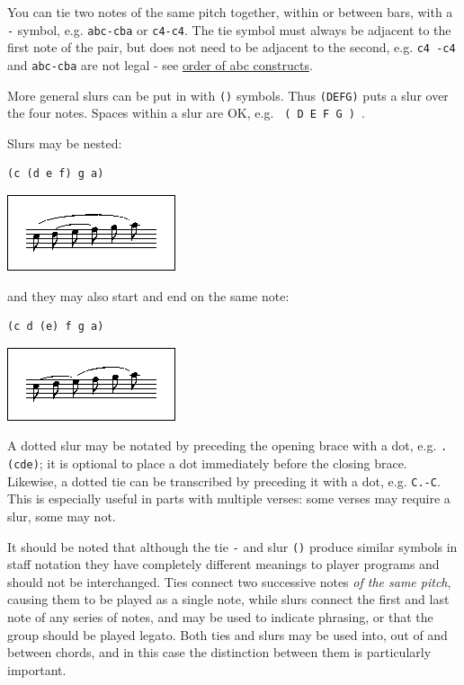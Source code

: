 \documentclass[oneside]{book}
\begin{document}
You can tie two notes of the same pitch together, within or between
bars, with a \texttt{-} symbol, e.g. \texttt{abc-\textbar{}cba} or
\texttt{c4-c4}. The tie symbol must always be adjacent to the first note
of the pair, but does not need to be adjacent to the second, e.g.
\texttt{c4\ -c4} and \texttt{abc\textbar{}-cba} are not legal - see
\protect\hyperlink{order_of_abc_constructs}{order of abc constructs}.

More general slurs can be put in with \texttt{()} symbols. Thus
\texttt{(DEFG)} puts a slur over the four notes. Spaces within a slur
are OK, e.g. \texttt{\ (\ D\ E\ F\ G\ )\ }.

Slurs may be nested:

\begin{verbatim}
(c (d e f) g a)
\end{verbatim}

\href{/wiki/_detail/abc:standard:slur1-80.png?id=abc\%3Astandard\%3Av2.1}{\includegraphics{wiki/_media/abc-standard-slur1-80.png}}

and they may also start and end on the same note:

\begin{verbatim}
(c d (e) f g a)
\end{verbatim}

\href{/wiki/_detail/abc:standard:slur2-80.png?id=abc\%3Astandard\%3Av2.1}{\includegraphics{wiki/_media/abc-standard-slur2-80.png}}

A dotted slur may be notated by preceding the opening brace with a dot,
e.g. \texttt{.(cde)}; it is optional to place a dot immediately before
the closing brace. Likewise, a dotted tie can be transcribed by
preceding it with a dot, e.g. \texttt{C.-C}. This is especially useful
in parts with multiple verses: some verses may require a slur, some may
not.

It should be noted that although the tie \texttt{-} and slur \texttt{()}
produce similar symbols in staff notation they have completely different
meanings to player programs and should not be interchanged. Ties connect
two successive notes \emph{of the same pitch}, causing them to be played
as a single note, while slurs connect the first and last note of any
series of notes, and may be used to indicate phrasing, or that the group
should be played legato. Both ties and slurs may be used into, out of
and between chords, and in this case the distinction between them is
particularly important.
\end{document}
